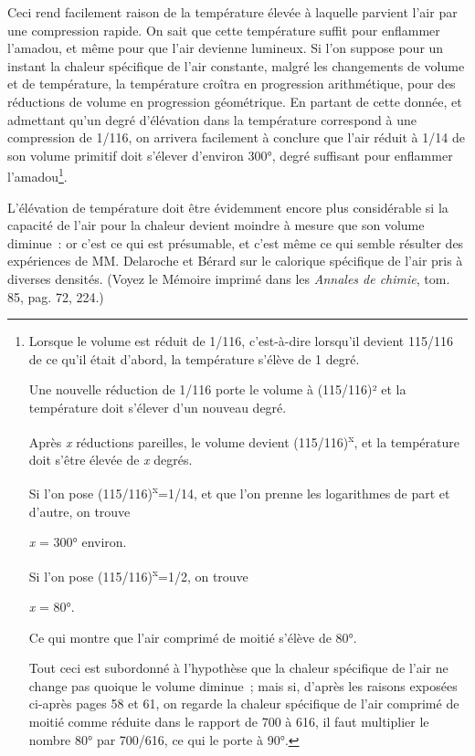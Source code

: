 \documentclass[french,twoside]{book} %
\begin{document}
Ceci rend facilement raison de la température élevée à laquelle parvient l’air par une compression rapide. On sait que cette température suffit pour enflammer l’amadou, et même pour que l’air devienne lumineux. Si l’on suppose pour un instant la chaleur spécifique de l’air constante, malgré les changements de volume et de température, la température croîtra en progression arithmétique, pour des réductions de volume en progression géométrique. En partant de cette donnée, et admettant qu’un degré d’élévation dans la température correspond à une compression de 1/116, on arrivera facilement à conclure que l’air réduit à 1/14 de son volume primitif doit s’élever d’environ 300°, degré suffisant pour enflammer l’amadou\footnote{ \noindent Lorsque le volume est réduit de 1/116, c’est-à-dire lorsqu’il devient 115/116 de ce qu’il était d’abord, la température s’élève de 1 degré.\par
 Une nouvelle réduction de 1/116 porte le volume à (115/116)² et la température doit s’élever d’un nouveau degré.\par
 Après \emph{x} réductions pareilles, le volume devient (115/116)\textsuperscript{x}, et la température doit s’être élevée de \emph{x} degrés.\par
 Si l’on pose (115/116)\textsuperscript{x}=1/14, et que l’on prenne les logarithmes de part et d’autre, on trouve\par
 
\begin{center}
\noindent \emph{x} = 300° environ.\par
\end{center}

 \noindent Si l’on pose (115/116)\textsuperscript{x}=1/2, on trouve\par
 
\begin{center}
\noindent \emph{x} = 80°.\par
\end{center}

 \noindent Ce qui montre que l’air comprimé de moitié s’élève de 80°.\par
 Tout ceci est subordonné à l’hypothèse que la chaleur spécifique de l’air ne change pas quoique le volume diminue ; mais si, d’après les raisons exposées ci-après pages 58 et 61, on regarde la chaleur spécifique de l’air comprimé de moitié comme réduite dans le rapport de 700 à 616, il faut multiplier le nombre 80° par 700/616, ce qui le porte à 90°.
}.\par
L’élévation de température doit être évidemment encore plus considérable si la capacité de l’air pour la chaleur devient moindre à mesure que son volume diminue : or c’est ce qui est présumable, et c’est même ce qui semble résulter des expériences de MM. Delaroche et Bérard sur le calorique spécifique de l’air pris à diverses densités. (Voyez le Mémoire imprimé dans les \emph{Annales de chimie}, tom. 85, pag. 72, 224.)\par
\end{document}

